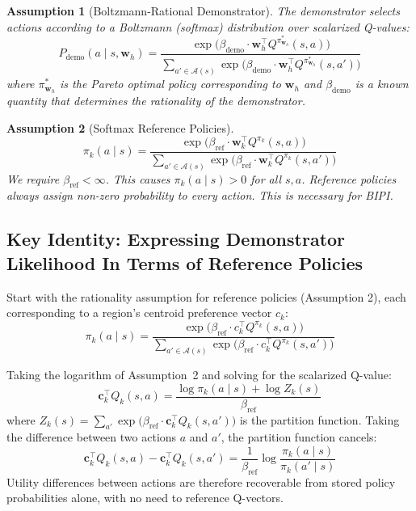 \documentclass[11pt]{article}
\newtheorem{assumption}{Assumption}
\begin{document}
\begin{assumption}[Boltzmann-Rational Demonstrator]
\label{a:boltz}
The demonstrator selects actions according to a Boltzmann (softmax) distribution over scalarized Q-values:
\begin{equation}
    P_{\text{demo}}(a \mid s, \mathbf{w}_h) = \frac{\exp\!\big(\beta_{\text{demo}} \cdot \mathbf{w}_h^\top Q^{\pi^*_{\mathbf{w}_h}}(s, a)\big)}{\displaystyle\sum_{a' \in \mathcal{A}(s)} \exp\!\big(\beta_{\text{demo}} \cdot \mathbf{w}_h^\top Q^{\pi^*_{\mathbf{w}_h}}(s, a')\big)}
\end{equation}
where $\pi^*_{\mathbf{w}_h}$ is the Pareto optimal policy corresponding to $\mathbf{w}_h$ and $\beta_{\text{demo}}$ is a known quantity that determines the rationality of the demonstrator.
\end{assumption}
\begin{assumption}[Softmax Reference Policies]
\begin{equation}
\label{eq:softmax_policy}
    \pi_k(a \mid s) = \frac{\exp\!\big(\beta_{\text{ref}} \cdot \mathbf{w}_k^\top Q^{\pi_k}(s, a)\big)}{\displaystyle\sum_{a' \in \mathcal{A}(s)} \exp\!\big(\beta_{\text{ref}} \cdot \mathbf{w}_k^\top Q^{\pi_k}(s, a')\big)}
\end{equation}
We require $\beta_{\text{ref}}<\infty$. This causes $\pi_k(a \mid s) > 0$ for all $s, a$. Reference policies always assign non-zero probability to every action. This is necessary for BIPI.
\end{assumption}


\subsection*{Key Identity: Expressing Demonstrator Likelihood In Terms of Reference Policies}

Start with the rationality assumption for reference policies (Assumption 2), each corresponding to a region's centroid preference vector $c_k$:
\begin{equation*}
\label{eq:softmax_policy}
    \pi_k(a \mid s) = \frac{\exp\!\big(\beta_{\text{ref}} \cdot c_k^\top Q^{\pi_k}(s, a)\big)}{\displaystyle\sum_{a' \in \mathcal{A}(s)} \exp\!\big(\beta_{\text{ref}} \cdot c_k^\top Q^{\pi_k}(s, a')\big)}
\end{equation*}


Taking the logarithm of Assumption~2 and solving for the scalarized Q-value:
\begin{equation}
    \mathbf{c}_k^\top Q_k(s, a) = \frac{\log \pi_k(a \mid s) + \log Z_k(s)}{\beta_{\text{ref}}}
\end{equation}
where $Z_k(s) = \sum_{a'} \exp\!\big(\beta_{\text{ref}} \cdot \mathbf{c}_k^\top Q_k(s, a')\big)$ is the partition function. Taking the difference between two actions $a$ and $a'$, the partition function cancels:
\begin{equation}
    \mathbf{c}_k^\top Q_k(s, a) - \mathbf{c}_k^\top Q_k(s, a') = \frac{1}{\beta_{\text{ref}}} \log \frac{\pi_k(a \mid s)}{\pi_k(a' \mid s)}
\end{equation}
Utility differences between actions are therefore recoverable from stored policy probabilities alone, with no need to reference Q-vectors.
\end{document}
